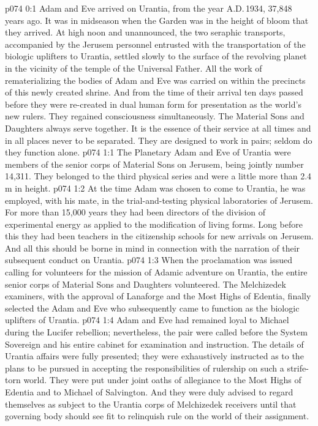 \author{Solonia}
\vs p074 0:1 Adam and Eve arrived on Urantia, from the year A.D.\,1934, 37,848 years ago. It was in midseason when the Garden was in the height of bloom that they arrived. At high noon and unannounced, the two seraphic transports, accompanied by the Jerusem personnel entrusted with the transportation of the biologic uplifters to Urantia, settled slowly to the surface of the revolving planet in the vicinity of the temple of the Universal Father. All the work of rematerializing the bodies of Adam and Eve was carried on within the precincts of this newly created shrine. And from the time of their arrival ten days passed before they were re\hyp{}created in dual human form for presentation as the world’s new rulers. They regained consciousness simultaneously. The Material Sons and Daughters always serve together. It is the essence of their service at all times and in all places never to be separated. They are designed to work in pairs; seldom do they function alone.
\vs p074 1:1 The Planetary Adam and Eve of Urantia were members of the senior corps of Material Sons on Jerusem, being jointly number 14,311. They belonged to the third physical series and were a little more than 2.4\,m in height.
\vs p074 1:2 At the time Adam was chosen to come to Urantia, he was employed, with his mate, in the trial\hyp{}and\hyp{}testing physical laboratories of Jerusem. For more than 15,000 years they had been directors of the division of experimental energy as applied to the modification of living forms. Long before this they had been teachers in the citizenship schools for new arrivals on Jerusem. And all this should be borne in mind in connection with the narration of their subsequent conduct on Urantia.
\vs p074 1:3 When the proclamation was issued calling for volunteers for the mission of Adamic adventure on Urantia, the entire senior corps of Material Sons and Daughters volunteered. The Melchizedek examiners, with the approval of Lanaforge and the Most Highs of Edentia, finally selected the Adam and Eve who subsequently came to function as the biologic uplifters of Urantia.
\vs p074 1:4 Adam and Eve had remained loyal to Michael during the Lucifer rebellion; nevertheless, the pair were called before the System Sovereign and his entire cabinet for examination and instruction. The details of Urantia affairs were fully presented; they were exhaustively instructed as to the plans to be pursued in accepting the responsibilities of rulership on such a strife\hyp{}torn world. They were put under joint oaths of allegiance to the Most Highs of Edentia and to Michael of Salvington. And they were duly advised to regard themselves as subject to the Urantia corps of Melchizedek receivers until that governing body should see fit to relinquish rule on the world of their assignment.
